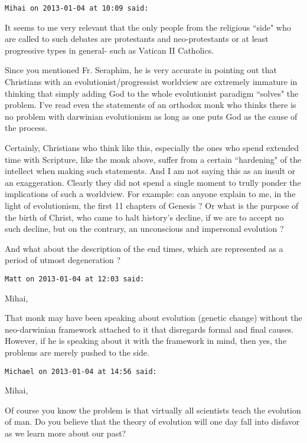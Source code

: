 \begin{footnotesize}\begin{sffamily}



\texttt{Mihai on 2013-01-04 at 10:09 said: }

It seems to me very relevant that the only people from the religious ``side" who are called to such debates are protestants and neo-protestants or at least progressive types in general- such as Vatican II Catholics. 

Since you mentioned Fr. Seraphim, he is very accurate in pointing out that Christians with an evolutionist/progressist worldview are extremely immature in thinking that simply adding God to the whole evolutionist paradigm ``solves" the problem. I've read even the statements of an orthodox monk who thinks there is no problem with darwinian evolutionism as long as one puts God as the cause of the process. 

Certainly, Christians who think like this, especially the ones who spend extended time with Scripture, like the monk above, suffer from a certain ``hardening" of the intellect when making such statements. And I am not saying this as an insult or an exaggeration. Clearly they did not spend a single moment to trully ponder the implications of such a worldview. For example: can anyone explain to me, in the light of evolutionism, the first 11 chapters of Genesis ? Or what is the purpose of the birth of Christ, who came to halt history's decline, if we are to accept no such decline, but on the contrary, an unconscious and impersonal evolution ?

And what about the description of the end times, which are represented as a period of utmost degeneration ?


\hfill

\texttt{Matt on 2013-01-04 at 12:03 said: }

Mihai,

That monk may have been speaking about evolution (genetic change) without the neo-darwinian framework attached to it that disregards formal and final causes. However, if he is speaking about it with the framework in mind, then yes, the problems are merely pushed to the side.


\hfill

\texttt{Michael on 2013-01-04 at 14:56 said: }

Mihai,

Of course you know the problem is that virtually all scientists teach the evolution of man. Do you believe that the theory of evolution will one day fall into disfavor as we learn more about our past?



\end{sffamily}
\end{footnotesize}
